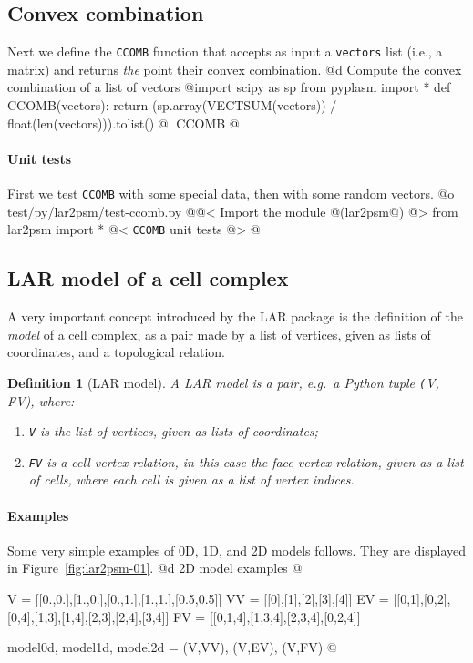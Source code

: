 \documentclass[11pt,oneside]{article}	%
\newtheorem{definition}{Definition}
\begin{document}
\subsection{Convex combination}
Next we define the \texttt{CCOMB} function that accepts as input a \texttt{vectors} list (i.e., a matrix) and returns \emph{the} point their convex combination.
@d Compute the convex combination of a list of vectors
@{import scipy as sp
from pyplasm import *
def CCOMB(vectors):
    return (sp.array(VECTSUM(vectors)) / float(len(vectors))).tolist()  
@| CCOMB @}

\paragraph{Unit tests}
First we test \texttt{CCOMB} with some special data, then with some random vectors.
@o test/py/lar2psm/test-ccomb.py
@{@< Import the module @(lar2psm@) @>
from lar2psm import *
@< \texttt{CCOMB} unit tests @>
@}

\subsection{LAR model of a cell complex}

A very important concept introduced by the LAR package is the definition of the \emph{model} of a cell complex, as a pair made by a list of vertices, given as lists of coordinates, and a topological relation.

\begin{definition}[LAR model]
A \emph{LAR model} is a pair, e.g.~a Python tuple \emph{\texttt(V, FV)}, where:
\begin{enumerate}
\item \texttt{V} is the list of vertices, given as lists of coordinates;
\item \texttt{FV} is a \emph{cell-vertex} relation, in this case the face-vertex relation, given as a list of cells, where each cell is given as a list of vertex indices.
\end{enumerate}
\end{definition}

\paragraph{Examples} 
Some very simple examples of 0D, 1D, and 2D models follows. They are displayed in Figure~\ref{fig:lar2psm-01}.
@d 2D model examples 
@{V = [[0.,0.],[1.,0.],[0.,1.],[1.,1.],[0.5,0.5]]
VV = [[0],[1],[2],[3],[4]]
EV = [[0,1],[0,2],[0,4],[1,3],[1,4],[2,3],[2,4],[3,4]]
FV = [[0,1,4],[1,3,4],[2,3,4],[0,2,4]]

model0d, model1d, model2d = (V,VV), (V,EV), (V,FV)
@}
\end{document}
